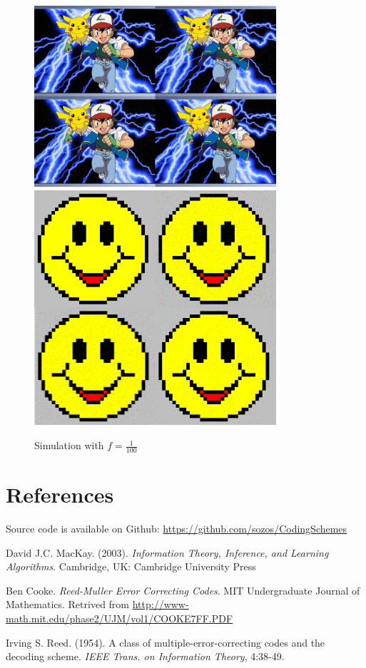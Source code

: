 \documentclass[12pt, a4paper]{article}
\begin{document}
\begin{figure}[H]
	\centering
	\includegraphics[width=0.8\textwidth]{pokemon_tile100.png}
	\includegraphics[width=0.8\textwidth]{smiley_tile100.png}
	\caption{Simulation with $f = \frac{1}{100}$}
\end{figure}

\section{References}
Source code is available on Github: \url{https://github.com/sozos/CodingSchemes}

David J.C. MacKay. (2003). \textit{Information Theory, Inference, and Learning Algorithms}. Cambridge, UK: Cambridge University Press

Ben Cooke. \textit{Reed-Muller Error Correcting Codes}. MIT Undergraduate Journal of Mathematics. Retrived from \url{http://www-math.mit.edu/phase2/UJM/vol1/COOKE7FF.PDF}

Irving S. Reed. (1954). A class of multiple-error-correcting codes and the decoding scheme. \textit{IEEE Trans. on Information Theory}, 4:38-49.

\end{document}
